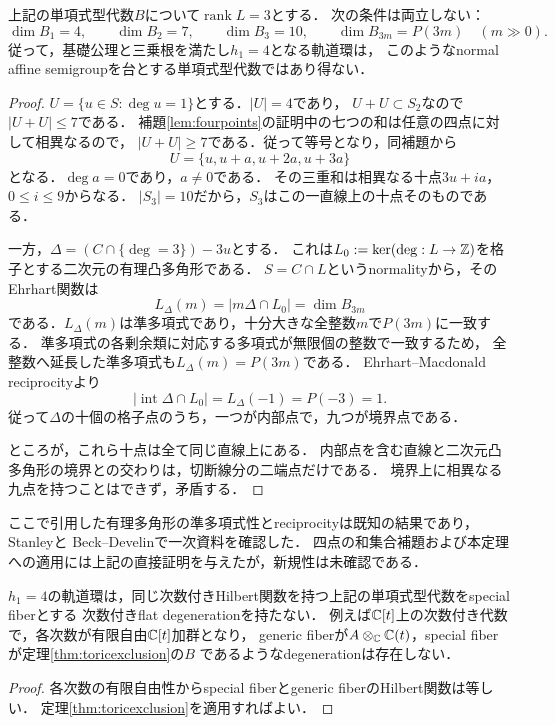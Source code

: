 \documentclass[11pt,a4paper]{ltjsarticle}
\begin{document}
\begin{theorem}[normal半群型の最小増大の排除]\label{thm:toricexclusion}
上記の単項式型代数$B$について$\operatorname{rank}L=3$とする．
次の条件は両立しない：
\[
 \dim B_1=4,\qquad\dim B_2=7,\qquad\dim B_3=10,
 \qquad\dim B_{3m}=P(3m)\quad(m\gg0).
\]
従って，基礎公理と三乗根を満たし$h_1=4$となる軌道環は，
このようなnormal affine semigroupを台とする単項式型代数ではあり得ない．
\end{theorem}
\begin{proof}
$U=\{u\in S:\deg u=1\}$とする．$|U|=4$であり，
$U+U\subset S_2$なので$|U+U|\leq7$である．
補題\ref{lem:fourpoints}の証明中の七つの和は任意の四点に対して相異なるので，
$|U+U|\geq7$である．従って等号となり，同補題から
\[
 U=\{u,u+a,u+2a,u+3a\}
\]
となる．$\deg a=0$であり，$a\ne0$である．
その三重和は相異なる十点$3u+ia$，$0\leq i\leq9$からなる．
$|S_3|=10$だから，$S_3$はこの一直線上の十点そのものである．

一方，$\Delta=(C\cap\{\deg=3\})-3u$とする．
これは$L_0:=\ker(\deg:L\to\mathbb Z)$を格子とする二次元の有理凸多角形である．
$S=C\cap L$というnormalityから，そのEhrhart関数は
\[
 L_\Delta(m)=|m\Delta\cap L_0|=\dim B_{3m}
\]
である．$L_\Delta(m)$は準多項式であり，十分大きな全整数$m$で$P(3m)$に一致する．
準多項式の各剰余類に対応する多項式が無限個の整数で一致するため，
全整数へ延長した準多項式も$L_\Delta(m)=P(3m)$である．
Ehrhart--Macdonald reciprocityより
\[
 |\operatorname{int}\Delta\cap L_0|=L_\Delta(-1)=P(-3)=1.
\]
従って$\Delta$の十個の格子点のうち，一つが内部点で，九つが境界点である．

ところが，これら十点は全て同じ直線上にある．
内部点を含む直線と二次元凸多角形の境界との交わりは，切断線分の二端点だけである．
境界上に相異なる九点を持つことはできず，矛盾する．
\end{proof}

ここで引用した有理多角形の準多項式性とreciprocityは既知の結果であり，
Stanley\cite[\S6, Proposition 6.1, p.~208]{StanleyReciprocity}と
Beck--Develin\cite[\S4, Theorem 5]{BeckDevelin}で一次資料を確認した．
四点の和集合補題および本定理への適用には上記の直接証明を与えたが，新規性は未確認である．

\begin{corollary}\label{cor:toricdegeneration}
$h_1=4$の軌道環は，同じ次数付きHilbert関数を持つ上記の単項式型代数をspecial fiberとする
次数付きflat degenerationを持たない．
例えば$\mathbb C[t]$上の次数付き代数で，各次数が有限自由$\mathbb C[t]$加群となり，
generic fiberが$A\otimes_\mathbb C\mathbb C(t)$，special fiberが定理\ref{thm:toricexclusion}の$B$
であるようなdegenerationは存在しない．
\end{corollary}
\begin{proof}
各次数の有限自由性からspecial fiberとgeneric fiberのHilbert関数は等しい．
定理\ref{thm:toricexclusion}を適用すればよい．
\end{proof}
\end{document}
